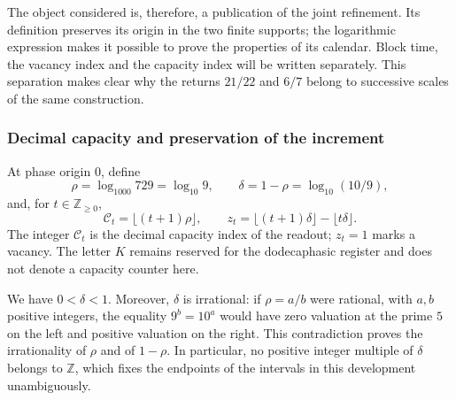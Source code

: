 The object considered is, therefore, a publication of the joint
refinement. Its definition preserves its origin in the two finite supports;
the logarithmic expression makes it possible to prove the properties of its
calendar. Block time, the vacancy index and the capacity
index will be written separately. This separation makes clear
why the returns \(21/22\) and \(6/7\) belong to successive scales of
the same construction.

\subsubsection{Decimal capacity and preservation of the increment}
\label{viii:vac-add-capacidad}

\begin{definition}
\label{viii:vac-add-definicion}
At phase origin \(0\), define
\begin{equation}
 \rho=\log_{1000}729=\log_{10}9,
 \qquad \delta=1-\rho=\log_{10}(10/9),
 \label{viii:vac-add-densidad}
\end{equation}
and, for \(t\in\mathbb Z_{\geq0}\),
\begin{equation}
 \mathcal C_t=\lfloor(t+1)\rho\rfloor,
 \qquad
 z_t=\lfloor(t+1)\delta\rfloor-\lfloor t\delta\rfloor.
 \label{viii:vac-add-indices}
\end{equation}
The integer \(\mathcal C_t\) is the decimal capacity index of the readout; \(z_t=1\) marks a vacancy. The letter \(K\) remains reserved for the dodecaphasic register and does not denote a capacity counter here.
\end{definition}

We have \(0<\delta<1\). Moreover, \(\delta\) is irrational: if \(\rho=a/b\) were rational, with \(a,b\) positive integers, the equality \(9^b=10^a\) would have zero valuation at the prime \(5\) on the left and positive valuation on the right. This contradiction proves the irrationality of \(\rho\) and of \(1-\rho\). In particular, no positive integer multiple of \(\delta\) belongs to \(\mathbb Z\), which fixes the endpoints of the intervals in this development unambiguously.

